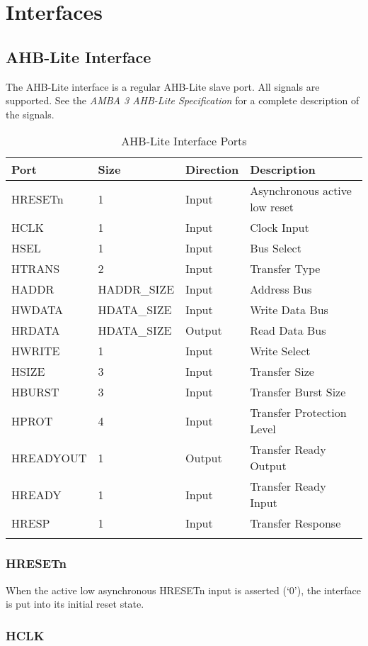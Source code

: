 \chapter{Interfaces}\label{interfaces}

\section{AHB-Lite Interface}\label{ahb-lite-interface}

The AHB-Lite interface is a regular AHB-Lite slave port. All signals are
supported. See the \emph{AMBA 3 AHB-Lite Specification} for a complete
description of the signals.

\begin{longtable}[]{@{}llll@{}}
	\toprule
	Port      & Size        & Direction & Description\tabularnewline
	\midrule
	\endhead
	HRESETn   & 1           & Input  & Asynchronous active low reset\tabularnewline
	HCLK      & 1           & Input  & Clock Input\tabularnewline
	HSEL      & 1           & Input  & Bus Select\tabularnewline
	HTRANS    & 2           & Input  & Transfer Type\tabularnewline
	HADDR     & HADDR\_SIZE & Input  & Address Bus\tabularnewline
	HWDATA    & HDATA\_SIZE & Input  & Write Data Bus\tabularnewline
	HRDATA    & HDATA\_SIZE & Output & Read Data Bus\tabularnewline
	HWRITE    & 1           & Input  & Write Select\tabularnewline
	HSIZE     & 3           & Input  & Transfer Size\tabularnewline
	HBURST    & 3           & Input  & Transfer Burst Size\tabularnewline
	HPROT     & 4           & Input  & Transfer Protection Level\tabularnewline
	HREADYOUT & 1           & Output & Transfer Ready Output\tabularnewline
	HREADY    & 1           & Input  & Transfer Ready Input\tabularnewline
	HRESP     & 1           & Input  & Transfer Response\tabularnewline
	\bottomrule
	\caption{AHB-Lite Interface	Ports}
\end{longtable}

 \subsection{HRESETn}\label{hresetn}

When the active low asynchronous HRESETn input is asserted (`0'), the
interface is put into its initial reset state.

 \subsection{HCLK}\label{hclk}

